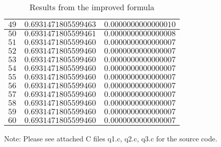 \documentclass{article}
\begin{document}
\begin{enumerate}
\begin{enumerate}
\begin{table}[H]
\begin{tabular}{ |c|c|c| }
 \hline
$49$ & $0.6931471805599463$ & $0.0000000000000010$ \\
 \hline
$50$ & $0.6931471805599461$ & $0.0000000000000008$ \\
 \hline
$51$ & $0.6931471805599460$ & $0.0000000000000007$ \\
 \hline
$52$ & $0.6931471805599460$ & $0.0000000000000007$ \\
 \hline
$53$ & $0.6931471805599460$ & $0.0000000000000007$ \\
 \hline
$54$ & $0.6931471805599460$ & $0.0000000000000007$ \\
 \hline
$55$ & $0.6931471805599460$ & $0.0000000000000007$ \\
 \hline
$56$ & $0.6931471805599460$ & $0.0000000000000007$ \\
 \hline
$57$ & $0.6931471805599460$ & $0.0000000000000007$ \\
 \hline
$58$ & $0.6931471805599460$ & $0.0000000000000007$ \\
 \hline
$59$ & $0.6931471805599460$ & $0.0000000000000007$ \\
 \hline
$60$ & $0.6931471805599460$ & $0.0000000000000007$ \\
 \hline
\end{tabular}
\caption{Results from the improved formula}
\label{table:2}
\end{table}

  \end{enumerate}

Note: Please see attached C files q1.c, q2.c, q3.c for the source code.


\end{enumerate}
\end{document}
